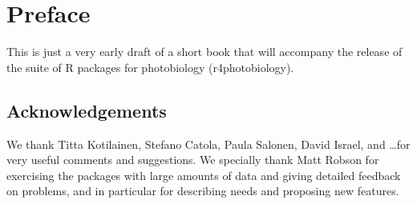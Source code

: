 \chapter{Preface}

This is just a very early draft of a short book that will accompany the release of the suite of R packages for photobiology (\textsf{r4photobiology}).

\section{Acknowledgements}

We thank Titta Kotilainen, Stefano Catola, Paula Salonen, David Israel, and \ldots for very useful comments and suggestions. We specially thank Matt Robson for exercising the packages with large amounts of data and giving detailed feedback on problems, and in particular for describing needs and proposing new features.
